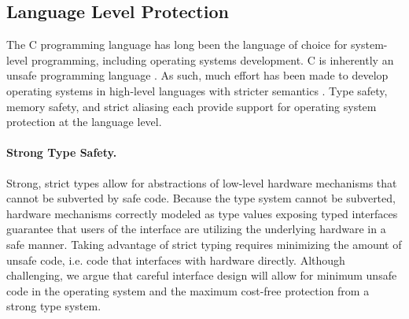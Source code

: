 \subsection{Language Level Protection}

The C programming language has long been the language of choice for system-level
programming, including operating systems development. C is inherently an unsafe
programming language \cite{kint:osdi2012, undefined:apsys2012}. As such, much
effort has been made to develop operating systems in high-level languages with
stricter semantics \cite{singularity:sigops, house:icfp2005, unikernels:2013}.
Type safety, memory safety, and strict aliasing each provide support for
operating system protection at the language level.

\paragraph{Strong Type Safety.}
Strong, strict types allow for abstractions of low-level hardware mechanisms
that cannot be subverted by safe code. Because the type system cannot be
subverted, hardware mechanisms correctly modeled as type values exposing typed interfaces
guarantee that users of the interface are utilizing the underlying hardware in a
safe manner.
Taking advantage of strict typing requires minimizing the amount of unsafe code,
i.e. code that interfaces with hardware directly.
Although challenging, we argue that careful interface design will allow
for minimum unsafe code in the operating system and the maximum cost-free
protection from a strong type system.

